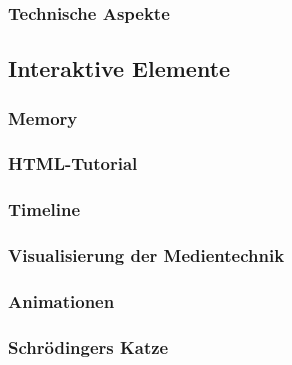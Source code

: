 \subsubsection{Technische Aspekte}
\subsection{Interaktive Elemente}
\subsubsection{Memory}
\subsubsection{HTML-Tutorial}
\subsubsection{Timeline}
\subsubsection{Visualisierung der Medientechnik}
\subsubsection{Animationen}
\subsubsection{Schrödingers Katze}
